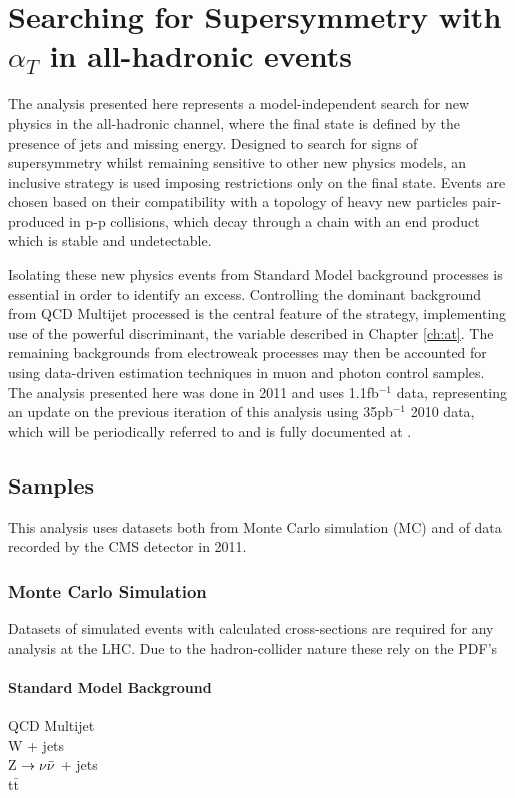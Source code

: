 \chapter{Searching for Supersymmetry with $\alpha_{T}$ in all-hadronic events}
The analysis presented here represents a model-independent search for new physics in the all-hadronic channel, where the final state is defined by the presence of jets and missing energy. Designed to search for signs of supersymmetry whilst remaining sensitive to other new physics models, an inclusive strategy is used imposing restrictions only on the final state. Events are chosen based on their compatibility with a topology of heavy new particles pair-produced in p-p collisions, which decay through a chain with an end product which is stable and undetectable.

Isolating these new physics events from Standard Model background processes is essential in order to identify an excess. Controlling the dominant background from QCD Multijet processed is the central feature of the strategy, implementing use of the powerful discriminant, the \alt variable described in Chapter \ref{ch:at}. The remaining backgrounds from electroweak processes may then be accounted for using data-driven estimation techniques in muon and photon control samples. The analysis presented here was done in 2011 and uses 1.1fb$^{-1}$ data, representing an update on the previous iteration of this analysis using 35pb$^{-1}$ 2010 data, which will be periodically referred to and is fully documented at \cite{35paper}.



\section{Samples}
This analysis uses datasets both from Monte Carlo simulation (MC) and of data recorded by the CMS detector in 2011.

\subsection{Monte Carlo Simulation}
Datasets of simulated events with calculated cross-sections are required for any analysis at the LHC. Due to the hadron-collider nature these rely on the PDF's
\subsubsection{Standard Model Background}
\begin{description}
\item[QCD Multijet]{}
\item[W + jets]{}
\item[Z $\rightarrow \nu\bar{\nu}$ + jets]{}
\item[t$\bar{\textrm{t}}$]{}
\end{description}
